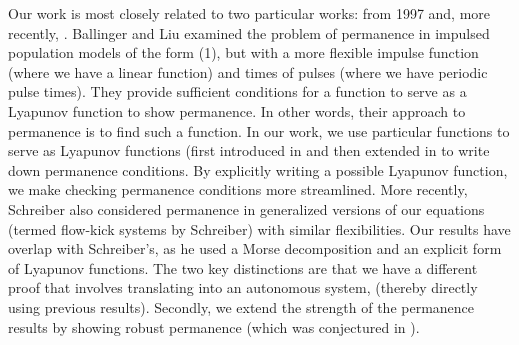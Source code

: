\documentclass{article}
\theoremstyle{definition}
\begin{document}
Our work is most closely related to two particular works: \cite{ballinger_persistence_of_general_ides_1997} from 1997 and, more recently, \cite{schreiber_flowkick_2025}. 
Ballinger and Liu \cite{ballinger_persistence_of_general_ides_1997} examined the problem of permanence in impulsed population models of the form (1), but with a more flexible impulse function (where we have a linear function) and times of pulses (where we have periodic pulse times).  They provide sufficient conditions for a function to serve as a Lyapunov function to show permanence.  In other words, their approach to permanence is to find such a function. 
In our work, we use particular functions to serve as Lyapunov functions (first introduced in \cite{garay_hofbauer_2003} and then extended in \cite{patel_schreiber_2018} to write down permanence conditions. By explicitly writing a possible Lyapunov function, we make checking permanence conditions more streamlined.  More recently, Schreiber \cite{schreiber_flowkick_2025} also considered permanence in generalized versions of our equations (termed flow-kick systems by Schreiber) with similar flexibilities.  Our results have overlap with Schreiber’s, as he used a Morse decomposition and an explicit form of Lyapunov functions.  The two key distinctions are that we have a different proof that involves translating into an autonomous system, (thereby directly using previous results).  Secondly, we extend the strength of the permanence results by showing robust permanence (which was conjectured in \cite{schreiber_flowkick_2025}). 


\end{document}
